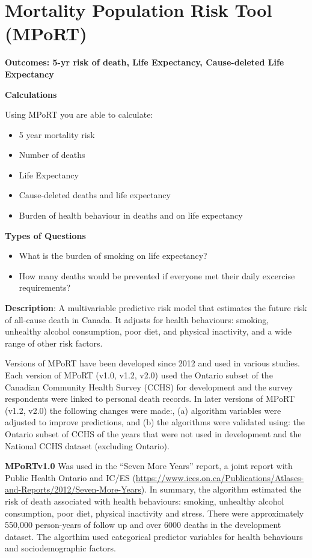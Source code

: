 \documentclass[]{book}
\providecommand{\tightlist}{%
  \setlength{\itemsep}{0pt}\setlength{\parskip}{0pt}}
\begin{document}
\appendix


\chapter{Mortality Population Risk Tool
(MPoRT)}\label{mortality-population-risk-tool-mport}

\textbf{Outcomes: 5-yr risk of death, Life Expectancy, Cause-deleted
Life Expectancy}

\textbf{Calculations}

Using MPoRT you are able to calculate:

\begin{itemize}
\tightlist
\item
  5 year mortality risk
\item
  Number of deaths
\item
  Life Expectancy
\item
  Cause-deleted deaths and life expectancy
\item
  Burden of health behaviour in deaths and on life expectancy
\end{itemize}

\textbf{Types of Questions}

\begin{itemize}
\tightlist
\item
  What is the burden of smoking on life expectancy?
\item
  How many deaths would be prevented if everyone met their daily
  excercise requirements?
\end{itemize}

\textbf{Description}: A multivariable predictive risk model that
estimates the future risk of all-cause death in Canada. It adjusts for
health behaviours: smoking, unhealthy alcohol consumption, poor diet,
and physical inactivity, and a wide range of other risk factors.

Versions of MPoRT have been developed since 2012 and used in various
studies. Each version of MPoRT (v1.0, v1.2, v2.0) used the Ontario
subset of the Canadian Community Health Survey (CCHS) for development
and the survey respondents were linked to personal death records. In
later versions of MPoRT (v1.2, v2.0) the following changes were made:,
(a) algorithm variables were adjusted to improve predictions, and (b)
the algorithms were validated using: the Ontario subset of CCHS of the
years that were not used in development and the National CCHS dataset
(excluding Ontario).

\textbf{MPoRTv1.0} Was used in the ``Seven More Years'' report, a joint
report with Public Health Ontario and IC/ES
(\url{https://www.ices.on.ca/Publications/Atlases-and-Reports/2012/Seven-More-Years}).
In summary, the algorithm estimated the risk of death associated with
health behaviours: smoking, unhealthy alcohol consumption, poor diet,
physical inactivity and stress. There were approximately 550,000
person-years of follow up and over 6000 deaths in the development
dataset. The algorthim used categorical predictor variables for health
behaviours and sociodemographic factors.
\end{document}
